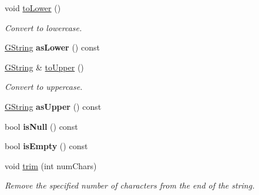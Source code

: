 \begin{Indent}
\begin{DoxyCompactItemize}
void \mbox{\hyperlink{classrev_1_1_g_string_a238b168af97d9eabb0c6c5f2c4312b40}{to\+Lower}} ()
\begin{DoxyCompactList}\small\item\em Convert to lowercase. \end{DoxyCompactList}\item 
\mbox{\label{classrev_1_1_g_string_ac0c13ce43db7d858010a2acbbf900890}} 
\mbox{\hyperlink{classrev_1_1_g_string}{G\+String}} {\bfseries as\+Lower} () const
\item 
\mbox{\label{classrev_1_1_g_string_a69dae973d326d0bfa60c13a230f393b0}} 
\mbox{\hyperlink{classrev_1_1_g_string}{G\+String}} \& \mbox{\hyperlink{classrev_1_1_g_string_a69dae973d326d0bfa60c13a230f393b0}{to\+Upper}} ()
\begin{DoxyCompactList}\small\item\em Convert to uppercase. \end{DoxyCompactList}\item 
\mbox{\label{classrev_1_1_g_string_a846aa281de176b12e80c44a102890dc6}} 
\mbox{\hyperlink{classrev_1_1_g_string}{G\+String}} {\bfseries as\+Upper} () const
\item 
\mbox{\label{classrev_1_1_g_string_a28eaa85cafe75ad3892f17c234e6a205}} 
bool {\bfseries is\+Null} () const
\item 
\mbox{\label{classrev_1_1_g_string_a5925fbda2a8ae550b9e48b5bc8e9b163}} 
bool {\bfseries is\+Empty} () const
\item 
\mbox{\label{classrev_1_1_g_string_a9103960893c931f157d8fa64b4f0087f}} 
void \mbox{\hyperlink{classrev_1_1_g_string_a9103960893c931f157d8fa64b4f0087f}{trim}} (int num\+Chars)
\begin{DoxyCompactList}\small\item\em Remove the specified number of characters from the end of the string. \end{DoxyCompactList}\end{DoxyCompactItemize}
\end{Indent}
